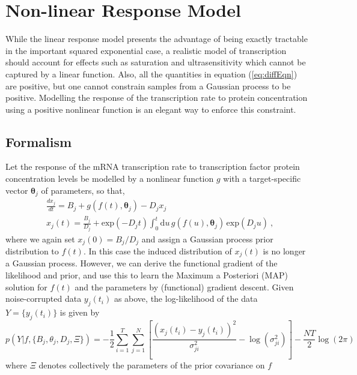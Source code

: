\documentclass[english]{article}
\begin{document}
\section{Non-linear Response Model}
\label{sec:nonlinear}

While the linear response model presents the advantage of being exactly 
tractable in the important squared exponential case, 
a realistic model of transcription should account for effects
such as saturation and ultrasensitivity which cannot be captured by a linear
function. Also, all the quantities in equation (\ref{eq:diffEqn}) are positive,
but one cannot constrain samples from a Gaussian process to be positive. 
Modelling the response of the transcription rate to protein concentration
using a positive nonlinear function is an elegant way to enforce this
constraint. 
\subsection{Formalism}
Let the response of the mRNA transcription rate to transcription factor 
protein concentration levels be modelled by a nonlinear function $g$ with 
a target-specific vector $\bm{\theta}_j$ of parameters, so that,
\begin{equation}\begin{split}
&\frac{dx_j}{dt} = B_j + g(f(t),\bm{\theta}_j) - D_j
x_j \\ & x_j(t) = \frac{B_j}{D_j} + \textrm{exp}\left(-D_j t\right)\int_{0}^t \mathrm{d}u
\, g(f(u),\bm\theta_j) \, \textrm{exp}\left(D_j u\right) \ ,
\end{split}\end{equation}
where we again set $x_j(0) = B_j/D_j$ and assign a Gaussian process prior
distribution to $f(t)$. In this case the induced distribution of $x_j(t)$
is no longer a Gaussian
process. However, we can derive the functional gradient of the
likelihood and prior, and use this to learn the Maximum a
Posteriori (MAP) solution for $f(t)$ and the parameters by
(functional) gradient descent. Given noise-corrupted data
$y_{j}\left(t_i\right)$ as above, the log-likelihood of the data $Y = \{y_{j}
\left(t_i\right)\}$ is given by
\begin{equation}
p(Y|f,\{B_j,\theta_j,D_j,\Xi\}) = -\frac{1}{2}\sum_{i=1}^T \sum_{j=1}^N 
\left[ 
\frac{\left( x_j(t_i) - y_{j}\left(t_i\right) \right)^2}{\sigma^2_{ji}} - \log\left(\sigma^2_{ji}\right)\right] - \frac{NT}{2}\log(2\pi) 
\end{equation}
where $\Xi$ denotes collectively the parameters of the prior covariance on $f$
\end{document}
